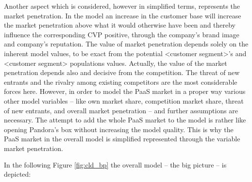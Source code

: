 Another aspect which is considered, however in simplified terms, represents the market penetration. In the model an increase in the customer base will increase the market penetration above what it would otherwise have been and thereby influence the corresponding \ac{CVP} positive, through the company's brand image and company's reputation. The value of market penetration depends solely on the inherent model values, to be exact from the potential <customer segment>'s and <customer segment> populations values. Actually, the value of the market penetration depends also and decisive from the competition. The threat of new entrants and the rivalry among existing competitors \citep[pp. 80-82, 85-86]{Porter2008} are the most considerable forces here. However, in order to model the \ac{PaaS} market in a proper way various other model variables -- like own market share, competition market share, threat of new entrants, and overall market penetration -- and further assumptions are necessary. The attempt	 to add the whole \ac{PaaS} market to the model is rather like opening Pandora's box without increasing the model quality. This is why the \ac{PaaS} market in the overall model is simplified represented through the variable market penetration.

In the following Figure \ref{fig:cld_bp} the overall model -- the big picture -- is depicted: